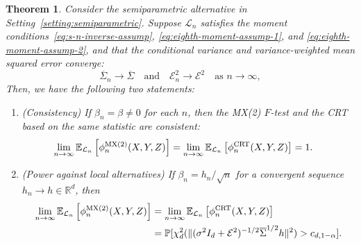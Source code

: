\documentclass[12pt]{article}
\newtheorem{theorem}{Theorem}
\theoremstyle{definition}
\theoremstyle{remark}
\newcommand{\srx}{X}
\newcommand{\srz}{Z}
\newcommand{\sry}{Y}
\begin{document}
\begin{theorem}  \label{thm:power}
Consider the semiparametric alternative in Setting~\ref{setting:semiparametric}. Suppose $\mathcal L_n$ satisfies the moment conditions~\eqref{eq:s-n-inverse-assump}, \eqref{eq:eighth-moment-assump-1}, and \eqref{eq:eighth-moment-assump-2}, and that the conditional variance and variance-weighted mean squared error converge:
\begin{equation}
	\overline \Sigma_n \rightarrow \overline{\Sigma} \quad \text{and} \quad \mathcal E_n^2 \rightarrow \mathcal E^2 \quad \text{as } n \rightarrow \infty,
	\label{eq:limits}
\end{equation}
Then, we have the following two statements:
\begin{enumerate}
\item[(a)] (Consistency) If $\beta_n = \beta \neq 0$ for each $n$, then the MX(2) $F$-test and the CRT based on the same statistic are consistent:
\begin{equation}
	\begin{split}
		\lim_{n \rightarrow \infty} \mathbb E_{\mathcal L_n}\left[\phi^{\textnormal{MX(2)}}_n(\srx, \sry, \srz)\right] &= \lim_{n \rightarrow \infty} \mathbb E_{\mathcal L_n}\left[\phi^{\textnormal{CRT}}_n(\srx, \sry, \srz)\right] = 1.
		\label{eq:consistency}
	\end{split}
\end{equation}
\item[(b)] (Power against local alternatives) If $\beta_n = h_n/\sqrt{n}$ for a convergent sequence ${h_n \rightarrow h \in \mathbb R^d}$, then
\begin{equation}
	\begin{split}
		\lim_{n \rightarrow \infty} \mathbb E_{\mathcal L_n}\left[\phi^{\textnormal{MX(2)}}_n(\srx, \sry, \srz)\right] &= \lim_{n \rightarrow \infty} \mathbb E_{\mathcal L_n}\left[\phi^{\textnormal{CRT}}_n(\srx, \sry, \srz)\right] \\
		&= \mathbb P[\chi^2_d(\|(\sigma^2I_d +\mathcal E^2)^{-1/2}\overline \Sigma^{1/2} h\|^2) > c_{d,1-\alpha}].
		\label{eq:main-conclusion}
	\end{split}
\end{equation}
\end{enumerate}
\end{theorem}
\end{document}
